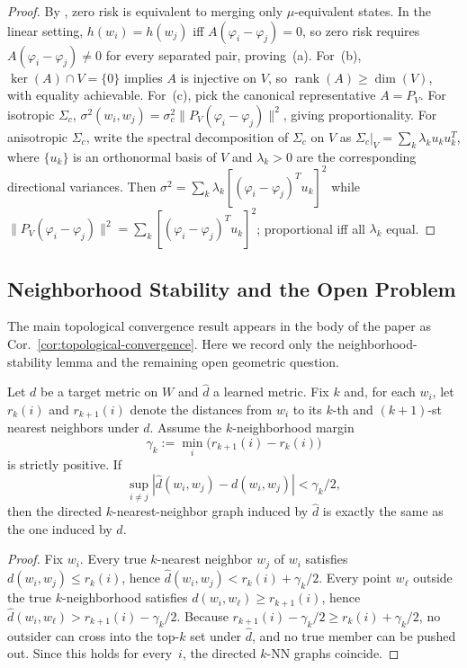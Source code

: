 \documentclass[twoside,11pt]{article}
\newcommand{\sigmasq}{\sigma^2}
\newcommand{\rank}{\operatorname{rank}}
\newcommand{\corref}[1]{Cor.~\ref{#1}}
\begin{document}
\begin{proof}
By \citet[Theorem~4.1(a)]{dallariva_2026}, zero risk is equivalent to merging only $\mu$-equivalent states. In the linear setting, $h(w_i) = h(w_j)$ iff $A(\varphi_i - \varphi_j) = 0$, so zero risk requires $A(\varphi_i - \varphi_j) \neq 0$ for every separated pair, proving~(a). For~(b), $\ker(A) \cap V = \{0\}$ implies $A$ is injective on $V$, so $\rank(A) \ge \dim(V)$, with equality achievable. For~(c), pick the canonical representative $A = P_V$. For isotropic $\Sigma_c$, $\sigmasq(w_i,w_j) = \sigma_c^2\|P_V(\varphi_i - \varphi_j)\|^2$, giving proportionality. For anisotropic $\Sigma_c$, write the spectral decomposition of $\Sigma_c$ on $V$ as $\Sigma_c|_V = \sum_k \lambda_k u_k u_k^T$, where $\{u_k\}$ is an orthonormal basis of $V$ and $\lambda_k > 0$ are the corresponding directional variances. Then $\sigmasq = \sum_k \lambda_k[(\varphi_i-\varphi_j)^T u_k]^2$ while $\|P_V(\varphi_i-\varphi_j)\|^2 = \sum_k[(\varphi_i-\varphi_j)^T u_k]^2$; proportional iff all $\lambda_k$ equal.
\end{proof}

\subsection{Neighborhood Stability and the Open Problem}

The main topological convergence result appears in the body of the paper as \corref{cor:topological-convergence}. Here we record only the neighborhood-stability lemma and the remaining open geometric question.

\begin{proposition}\label{prop:knn-stability}
Let $d$ be a target metric on $W$ and $\hat d$ a learned metric. Fix $k$ and, for each $w_i$, let $r_k(i)$ and $r_{k+1}(i)$ denote the distances from $w_i$ to its $k$-th and $(k+1)$-st nearest neighbors under $d$. Assume the $k$-neighborhood margin
\[
\gamma_k := \min_i \bigl(r_{k+1}(i) - r_k(i)\bigr)
\]
is strictly positive. If
\[
\sup_{i \neq j} |\hat d(w_i,w_j) - d(w_i,w_j)| < \gamma_k/2,
\]
then the directed $k$-nearest-neighbor graph induced by $\hat d$ is exactly the same as the one induced by $d$.
\end{proposition}

\begin{proof}
Fix $w_i$. Every true $k$-nearest neighbor $w_j$ of $w_i$ satisfies $d(w_i,w_j) \le r_k(i)$, hence $\hat d(w_i,w_j) < r_k(i) + \gamma_k/2$. Every point $w_\ell$ outside the true $k$-neighborhood satisfies $d(w_i,w_\ell) \ge r_{k+1}(i)$, hence $\hat d(w_i,w_\ell) > r_{k+1}(i) - \gamma_k/2$. Because $r_{k+1}(i)-\gamma_k/2 \ge r_k(i)+\gamma_k/2$, no outsider can cross into the top-$k$ set under $\hat d$, and no true member can be pushed out. Since this holds for every~$i$, the directed $k$-NN graphs coincide.
\end{proof}
\end{document}

